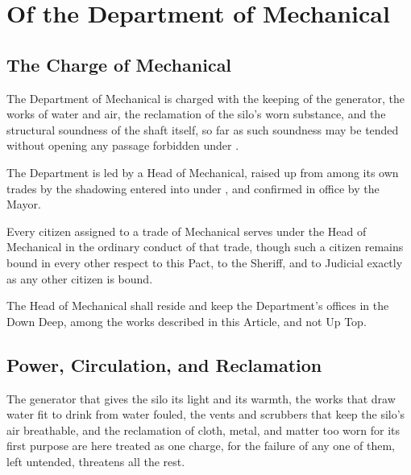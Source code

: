 \chapter{Of the Department of Mechanical}
\label{art:mechanical}


\section{The Charge of Mechanical}
\label{sec:mechanical:charge-of-mechanical}

The Department of Mechanical is charged with the keeping of the generator, the works of water and air, the reclamation of the silo's worn substance, and the structural soundness of the shaft itself, so far as such soundness may be tended without opening any passage forbidden under .

\begin{clauses}
\item The Department is led by a Head of Mechanical, raised up from among its own trades by the shadowing entered into under , and confirmed in office by the Mayor.
\item Every citizen assigned to a trade of Mechanical serves under the Head of Mechanical in the ordinary conduct of that trade, though such a citizen remains bound in every other respect to this Pact, to the Sheriff, and to Judicial exactly as any other citizen is bound.
\item The Head of Mechanical shall reside and keep the Department's offices in the Down Deep, among the works described in this Article, and not Up Top.
\end{clauses}

\section{Power, Circulation, and Reclamation}
\label{sec:mechanical:power-circulation-and-reclamation}

The generator that gives the silo its light and its warmth, the works that draw water fit to drink from water fouled, the vents and scrubbers that keep the silo's air breathable, and the reclamation of cloth, metal, and matter too worn for its first purpose are here treated as one charge, for the failure of any one of them, left untended, threatens all the rest.

